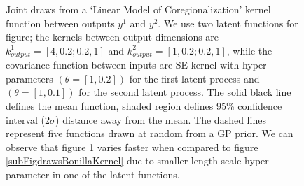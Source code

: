 \begin{figure}[!ht]
  \centering
    \quad
{}\quad

       \caption{Joint draws from a `Linear Model of Coregionalization' kernel function between outputs $y^{1}$ and $y^{2}$. We use two latent functions for figure; the kernels between output dimensions are $k_{output}^{1} = [4, 0.2; 0.2, 1]$ and $k_{output}^{2} = [1, 0.2; 0.2, 1]$, while the covariance function between inputs are SE kernel with hyper-parameters $(\theta = [1, 0.2])$ for the first latent process and $(\theta = [1, 0.1])$ for the second latent process. The solid black line defines the mean function, shaded region defines 95\% confidence interval (2$\sigma$) distance away from the mean. The dashed lines represent five functions drawn at random from a GP prior. We can observe that figure \ref{subFigdrawsLCMKernel} varies faster when compared to figure \ref{subFigdrawsBonillaKernel} due to smaller length scale hyper-parameter in one of the latent functions.}
       \label{subFigdrawsLCMKernel}
\end{figure}

